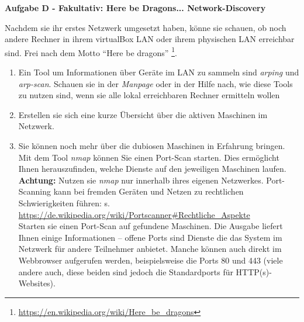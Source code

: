 \documentclass[paper=a4,fontsize=11pt]{scrartcl}%
\begin{document}
\begin{center}\Large{\textbf{Aufgabe D - Fakultativ: Here be Dragons... Network-Discovery}}\end{center}\vskip0.25in
Nachdem sie ihr erstes Netzwerk umgesetzt haben, könne sie schauen, ob noch andere Rechner in ihrem virtualBox LAN oder ihrem physischen LAN erreichbar sind. Frei nach dem Motto \enquote{Here be dragons} \footnote{\url{https://en.wikipedia.org/wiki/Here_be_dragons}}.
\begin{enumerate}
	\item Ein Tool um Informationen über Geräte im LAN zu sammeln sind \emph{arping} und \emph{arp-scan}. Schauen sie in der \emph{Manpage} oder in der Hilfe nach, wie diese Tools zu nutzen sind, wenn sie alle lokal erreichbaren Rechner ermitteln wollen
	\item Erstellen sie sich eine kurze Übersicht über die aktiven Maschinen im Netzwerk.
	\item Sie können noch mehr über die dubiosen Maschinen in Erfahrung bringen. Mit dem Tool \emph{nmap} können Sie einen Port-Scan starten. Dies ermöglicht Ihnen herauszufinden, welche Dienste auf den jeweiligen Maschinen laufen. \textbf{Achtung:} Nutzen sie \emph{nmap} nur innerhalb ihres eigenen Netzwerkes. Port-Scanning kann bei fremden Geräten und Netzen zu rechtlichen Schwierigkeiten führen: s. \url{https://de.wikipedia.org/wiki/Portscanner#Rechtliche_Aspekte}\\
	Starten sie einen Port-Scan auf gefundene Maschinen. Die Ausgabe liefert Ihnen einige Informationen -- offene Ports sind Dienste die das System im Netzwerk für andere Teilnehmer anbietet. Manche können auch direkt im Webbrowser aufgerufen werden, beispielsweise die Ports 80 und 443 (viele andere auch, diese beiden sind jedoch die Standardports für HTTP(s)-Websites).
\end{enumerate}
\end{document}
